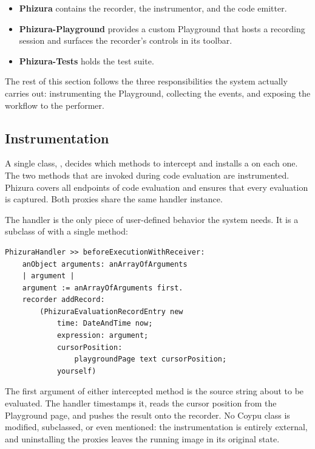 \documentclass[
]{ceurart}
\begin{document}
\begin{itemize}
\item \textbf{Phizura} contains the recorder, the instrumentor, and the code emitter.
\item \textbf{Phizura-Playground} provides a custom Playground that hosts a recording session and surfaces the recorder's controls in its toolbar.
\item \textbf{Phizura-Tests} holds the test suite.
\end{itemize}

The rest of this section follows the three responsibilities the system actually carries out: instrumenting the Playground, collecting the events, and exposing the workflow to the performer.

\subsection{Instrumentation}

A single class, , decides which methods to intercept and installs a  on each one.
The two methods that are invoked during code evaluation are instrumented.
Phizura covers all endpoints of code evaluation and ensures that every evaluation is captured.
Both proxies share the same handler instance.

The handler is the only piece of user-defined behavior the system needs.
It is a subclass of  with a single method:

\begin{lstlisting}[label={lst:handler-before},caption={PhizuraHandler before-execution hook}]
PhizuraHandler >> beforeExecutionWithReceiver:
    anObject arguments: anArrayOfArguments
    | argument |
    argument := anArrayOfArguments first.
    recorder addRecord:
        (PhizuraEvaluationRecordEntry new
            time: DateAndTime now;
            expression: argument;
            cursorPosition:
                playgroundPage text cursorPosition;
            yourself)
\end{lstlisting}

The first argument of either intercepted method is the source string about to be evaluated.
The handler timestamps it, reads the cursor position from the Playground page, and pushes the result onto the recorder.
No Coypu class is modified, subclassed, or even mentioned: the instrumentation is entirely external, and uninstalling the proxies leaves the running image in its original state.
\end{document}
